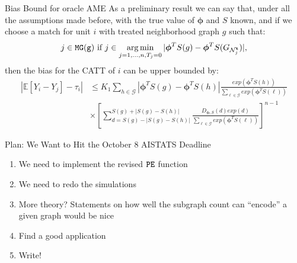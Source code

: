 \documentclass[newPxFont,numfooter,sectionpages]{beamer}
\DeclareMathOperator*{\argmin}{arg\,min}
\newcommand{\E}{\mathbb{E}}
\newcommand{\bt}{\mathbf{t}}
\newcommand{\Gnj}{G_{\mathcal{N}_j^\bt}}
\newcommand{\btheta}{\boldsymbol{\phi}}
\begin{document}
\begin{frame}{Bias Bound for oracle AME}
As a preliminary result we can say that, under all the assumptions made before, with the true value of $\btheta$ and $S$ known, and if we choose a match for unit $i$ with treated neighborhood graph $g$ such that:
\begin{align*}
j \in {\tt MG(g)} \text{ if } j \in \argmin_{j = 1, \dots, n, T_j = 0} |\btheta^TS(g) - \btheta^TS(\Gnj)|,
\end{align*}
then the bias for the CATT of $i$ can be upper bounded by:
\begin{align*}
|\E[Y_i - Y_j] - \tau_i| &\leq K_1\sum_{h \in \mathcal{G}}|\btheta^TS(g) - \btheta^TS(h)|\frac{exp(\btheta^TS(h))}{\sum_{\ell \in \mathcal{G}}exp(\btheta^TS(\ell))}\\
&\times\left[\sum_{d = S(g) - |S(g) - S(h)|}^{S(g) + |S(g) - S(h)|}\frac{D_{\btheta, S}(d)exp(d)}{\sum_{\ell \in \mathcal{G}}exp(\btheta^TS(\ell))}\right]^{n - 1}
\end{align*}
\end{frame}
\begin{frame}{Plan: We Want to Hit the October 8 AISTATS Deadline}
\begin{enumerate}
  \item We need to implement the revised $\tt PE$ function
  \item We need to redo the simulations
  \item More theory? Statements on how well the subgraph count can ``encode'' a given graph would be nice
  \item Find a good application
  \item Write!
\end{enumerate}
\end{frame}
\end{document}
